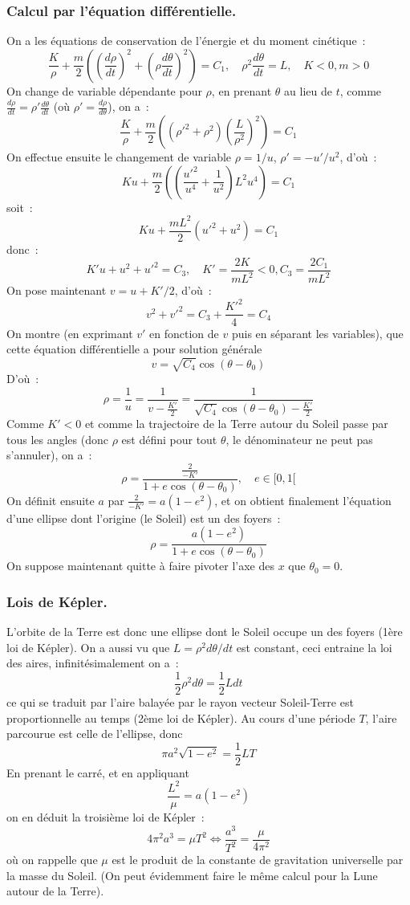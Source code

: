 \documentclass[a4paper,11pt]{article}
\begin{document}
\begin{giacjshere}
\subsubsection{Calcul par l'\'equation diff\'erentielle.}
On a les équations de conservation de l'\'energie et du moment cin\'etique~:
\[ \frac{K}{\rho}+\frac{m}{2} \left( \left(\frac{d\rho}{dt}\right)^2
+ \left(\rho \frac{d\theta}{dt} \right)^2 \right)
=C_1, \quad \rho^2 \frac{d\theta}{dt} = L, \quad K<0, m>0
\]
On change de variable dépendante pour $\rho$, 
en prenant $\theta$ au lieu de $t$,
comme $\frac{d\rho}{dt}=\rho' \frac{d\theta}{dt}$ 
(où $\rho'=\frac{d\rho}{d\theta}$), on a~:
\[
 \frac{K}{\rho}+\frac{m}{2}\left( (\rho'^2+\rho^2) 
\left(\frac{L}{\rho^2}\right)^2 \right) = C_1
\]
On effectue ensuite le changement de variable $\rho=1/u$, $\rho'=-u'/ u^2$,
d'où~:
\[
K u + \frac{m}{2} \left( 
\left(\frac{u'^2 }{u^4}+\frac{1}{u^2}\right) L^2 u^4 \right)
= C_1
\]
soit~:
\[ K u + \frac{mL^2}{2} ( u'^2+u^2) = C_1 \]
donc~:
\[ K' u + u^2 + u'^2 = C_3, \quad 
K'=\frac{2K}{mL^2} <0, C_3=\frac{2C_1}{mL^2}
\]
On pose maintenant $v=u+K'/2$, d'où~:
\[ v^2 + v'^2 = C_3 + \frac{K'^2}{4} = C_4 \]
On montre (en exprimant $v'$ en fonction de $v$ puis en séparant les
variables), que cette équation différentielle a pour solution générale
\[ v= \sqrt{C_4} \cos(\theta-\theta_0) \]
D'où~:
\[ \rho = \frac{1}{u} =
\frac{1}{v-\frac{K'}{2}} = 
\frac{1}{\sqrt{C_4} \cos(\theta-\theta_0)-\frac{K'}{2}}
\]
Comme $K'<0$ et comme la trajectoire de la Terre autour du Soleil
passe par tous les angles (donc $\rho$ est défini pour tout $\theta$,
le dénominateur ne peut pas s'annuler), on a~:
\[ \rho = \frac{\frac{2}{-K'}}{1+e \cos(\theta-\theta_0)}, \quad e \in [0,1[ \]
On définit ensuite $a$ par $\frac{2}{-K'}=a(1-e^2)$, et on obtient finalement
l'équation d'une ellipse dont l'origine (le Soleil) est un des
foyers~:
\[  \rho = \frac{a(1-e^2)}{1+e \cos(\theta-\theta_0)} \]
On suppose maintenant quitte à faire pivoter l'axe des $x$ que
$\theta_0=0$.

\subsubsection{Lois de K\'epler.}
L'orbite de la Terre est donc une ellipse dont le Soleil occupe un des foyers
(1\`ere loi de K\'epler).
On a aussi vu que $L=\rho^2 d\theta/dt$ est constant, ceci entraine la loi
des aires, infinit\'esimalement on a~:
\[ \frac{1}{2}\rho^2 d\theta = \frac{1}{2} L dt \]
ce qui se traduit par
l'aire balay\'ee par le rayon vecteur Soleil-Terre est proportionnelle
au temps (2\`eme loi de K\'epler). 
Au cours d'une p\'eriode $T$, l'aire parcourue est celle
de l'ellipse, donc 
\[ \pi a^2 \sqrt{1-e^2}=\frac{1}{2}LT \]
En prenant le carr\'e, et en appliquant
\[ \frac{L^2}{\mu}= a(1-e^2)\]
on en d\'eduit la troisi\`eme loi de K\'epler~:
\[ 4\pi^2 a^3 = \mu T^2 \Leftrightarrow \frac{a^3}{T^2} = \frac{\mu}{4\pi^2} \]
o\`u on rappelle que $\mu$ est le produit de la constante de gravitation
universelle par la masse du Soleil. (On peut \'evidemment faire
le m\^eme calcul pour la Lune autour de la Terre).


\end{giacjshere}
\end{document}
